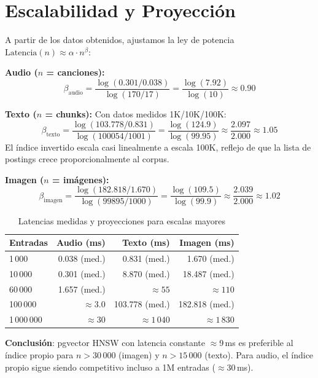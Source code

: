 \documentclass[12pt,a4paper]{article}
\begin{document}
\section{Escalabilidad y Proyección}
\label{sec:scalability}

A partir de los datos obtenidos, ajustamos la ley de potencia
$\text{Latencia}(n) \approx \alpha \cdot n^{\beta}$:

\noindent\textbf{Audio ($n$ = canciones):}
\[
  \beta_{\text{audio}} = \frac{\log(0.301/0.038)}{\log(170/17)}
        = \frac{\log(7.92)}{\log(10)} \approx 0.90
\]

\noindent\textbf{Texto ($n$ = chunks):} Con datos medidos 1K/10K/100K:
\[
  \beta_{\text{texto}} = \frac{\log(103.778/0.831)}{\log(100054/1001)}
        = \frac{\log(124.9)}{\log(99.95)}
        \approx \frac{2.097}{2.000} \approx 1.05
\]
El índice invertido escala casi linealmente a escala 100K,
reflejo de que la lista de postings crece proporcionalmente al corpus.

\noindent\textbf{Imagen ($n$ = imágenes):}
\[
  \beta_{\text{imagen}} = \frac{\log(182.818/1.670)}{\log(99895/1000)}
        = \frac{\log(109.5)}{\log(99.9)}
        \approx \frac{2.039}{2.000} \approx 1.02
\]

\begin{table}[H]
  \centering
  \caption{Latencias medidas y proyecciones para escalas mayores}
  \begin{tabular}{lrrr}
    \toprule
    \textbf{Entradas} & \textbf{Audio (ms)} & \textbf{Texto (ms)} & \textbf{Imagen (ms)} \\
    \midrule
    1\,000    & 0.038 (med.) & 0.831 (med.)   & 1.670 (med.)    \\
    10\,000   & 0.301 (med.) & 8.870 (med.)   & 18.487 (med.)   \\
    60\,000   & 1.657 (med.) & $\approx 55$   & $\approx 110$   \\
    100\,000  & $\approx 3.0$ & 103.778 (med.) & 182.818 (med.)  \\
    1\,000\,000 & $\approx 30$ & $\approx 1\,040$ & $\approx 1\,830$ \\
    \bottomrule
  \end{tabular}
\end{table}

\noindent\textbf{Conclusión}: pgvector HNSW con latencia constante $\approx$9\,ms es
preferible al índice propio para $n > 30\,000$ (imagen) y $n > 15\,000$ (texto).
Para audio, el índice propio sigue siendo competitivo incluso a 1M entradas ($\approx$30\,ms).
\end{document}

